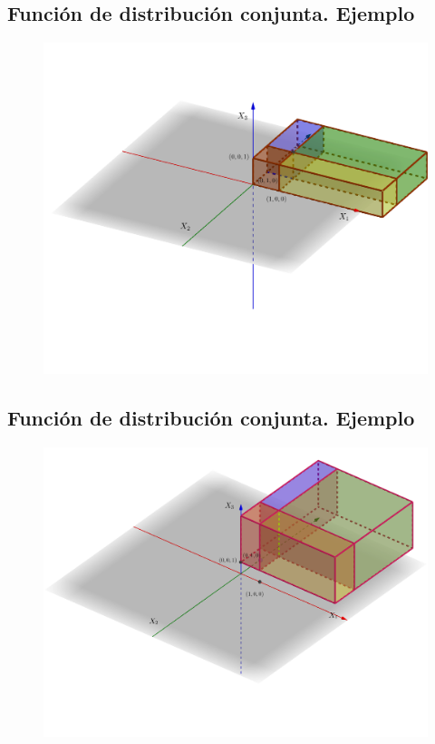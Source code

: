 \documentclass[]{book}
\begin{document}
\hypertarget{funciuxf3n-de-distribuciuxf3n-conjunta.-ejemplo-8}{%
\subsection{Función de distribución conjunta. Ejemplo}\label{funciuxf3n-de-distribuciuxf3n-conjunta.-ejemplo-8}}

\begin{figure}
\includegraphics[width=650px]{Images/Ej3DFxyz} \end{figure}

\hypertarget{funciuxf3n-de-distribuciuxf3n-conjunta.-ejemplo-9}{%
\subsection{Función de distribución conjunta. Ejemplo}\label{funciuxf3n-de-distribuciuxf3n-conjunta.-ejemplo-9}}

\begin{figure}
\includegraphics[width=650px]{Images/Ej3DFxy2pis} \end{figure}
\end{document}

